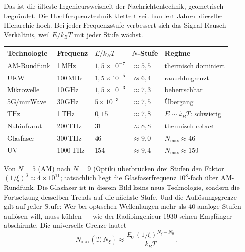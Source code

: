 Das ist die älteste Ingenieursweisheit der Nachrichtentechnik,
geometrisch begründet: Die Hochfrequenztechnik klettert seit hundert
Jahren dieselbe Hierarchie hoch. Bei jeder Frequenzstufe verbessert sich
das Signal-Rausch-Verhältnis, weil $E/k_BT$ mit jeder Stufe wächst.

\begin{center}
\footnotesize\renewcommand{\arraystretch}{1.25}
\begin{tabular}{p{2.2cm}p{1.3cm}p{1.6cm}p{1.2cm}p{2.9cm}}
\toprule
\textbf{Technologie} & \textbf{Frequenz} & \textbf{$E/k_BT$} & \textbf{$N$-Stufe} & \textbf{Regime} \\
\midrule
AM-Rundfunk & 1\,MHz & $1{,}5\times10^{-7}$ & $\approx5{,}5$ & thermisch dominiert \\
UKW & 100\,MHz & $1{,}5\times10^{-5}$ & $\approx6{,}4$ & rauschbegrenzt \\
Mikrowelle & 10\,GHz & $1{,}5\times10^{-3}$ & $\approx7{,}3$ & beherrschbar \\
5G/mmWave & 30\,GHz & $5\times10^{-3}$ & $\approx7{,}5$ & Übergang \\
THz & 1\,THz & $0{,}15$ & $\approx7{,}8$ & $E\sim k_BT$: schwierig \\
Nahinfrarot & 200\,THz & 31 & $\approx8{,}8$ & thermisch robust \\
Glasfaser & 300\,THz & 46 & $\approx9{,}0$ & $N_{\max}\approx46$ \\
UV & 1000\,THz & 154 & $\approx9{,}4$ & $N_{\max}\approx150$ \\
\bottomrule
\end{tabular}
\end{center}

Von $N = 6$ (AM) nach $N = 9$ (Optik) überbrücken drei Stufen den Faktor
$(1/\xi)^3\approx4\times10^{11}$; tatsächlich liegt die Glasfaserfrequenz
$10^8$-fach über AM-Rundfunk. Die Glasfaser ist in diesem Bild keine
neue Technologie, sondern die Fortsetzung desselben Trends auf die
nächste Stufe. Und die Auflösungsgrenze gilt auf jeder Stufe: Wer bei
optischen Wellenlängen mehr als 40 analoge Stufen auflösen will, muss
kühlen --- wie der Radioingenieur 1930 seinen Empfänger abschirmte. Die
universelle Grenze lautet
\begin{equation}
  N_{\max}(T,N_\xi)\approx\frac{E_0\,(1/\xi)^{N_\xi-N_0}}{k_BT}.
\end{equation}

